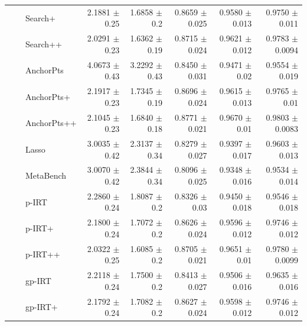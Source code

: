 \begin{longtable}{llp{}rrrrr}
 &  & Search+ & 2.1881 {\scriptsize $\pm$ 0.25} & 1.6858 {\scriptsize $\pm$ 0.2} & 0.8659 {\scriptsize $\pm$ 0.025} & 0.9580 {\scriptsize $\pm$ 0.013} & 0.9750 {\scriptsize $\pm$ 0.011} \\
 &  & Search++ & 2.0291 {\scriptsize $\pm$ 0.23} & 1.6362 {\scriptsize $\pm$ 0.19} & 0.8715 {\scriptsize $\pm$ 0.024} & 0.9621 {\scriptsize $\pm$ 0.012} & 0.9783 {\scriptsize $\pm$ 0.0094} \\
 &  & AnchorPts & 4.0673 {\scriptsize $\pm$ 0.43} & 3.2292 {\scriptsize $\pm$ 0.43} & 0.8450 {\scriptsize $\pm$ 0.031} & 0.9471 {\scriptsize $\pm$ 0.02} & 0.9554 {\scriptsize $\pm$ 0.019} \\
 &  & AnchorPts+ & 2.1917 {\scriptsize $\pm$ 0.23} & 1.7345 {\scriptsize $\pm$ 0.19} & 0.8696 {\scriptsize $\pm$ 0.024} & 0.9615 {\scriptsize $\pm$ 0.013} & 0.9765 {\scriptsize $\pm$ 0.01} \\
 &  & AnchorPts++ & 2.1045 {\scriptsize $\pm$ 0.23} & 1.6840 {\scriptsize $\pm$ 0.18} & 0.8771 {\scriptsize $\pm$ 0.021} & 0.9670 {\scriptsize $\pm$ 0.01} & 0.9803 {\scriptsize $\pm$ 0.0083} \\
 &  & Lasso & 3.0035 {\scriptsize $\pm$ 0.42} & 2.3137 {\scriptsize $\pm$ 0.34} & 0.8279 {\scriptsize $\pm$ 0.027} & 0.9397 {\scriptsize $\pm$ 0.017} & 0.9603 {\scriptsize $\pm$ 0.013} \\
 &  & MetaBench & 3.0070 {\scriptsize $\pm$ 0.42} & 2.3844 {\scriptsize $\pm$ 0.34} & 0.8096 {\scriptsize $\pm$ 0.025} & 0.9348 {\scriptsize $\pm$ 0.016} & 0.9534 {\scriptsize $\pm$ 0.014} \\
 &  & p-IRT & 2.2860 {\scriptsize $\pm$ 0.24} & 1.8087 {\scriptsize $\pm$ 0.2} & 0.8326 {\scriptsize $\pm$ 0.03} & 0.9450 {\scriptsize $\pm$ 0.018} & 0.9546 {\scriptsize $\pm$ 0.018} \\
 &  & p-IRT+ & 2.1800 {\scriptsize $\pm$ 0.24} & 1.7072 {\scriptsize $\pm$ 0.2} & 0.8626 {\scriptsize $\pm$ 0.024} & 0.9596 {\scriptsize $\pm$ 0.012} & 0.9746 {\scriptsize $\pm$ 0.012} \\
 &  & p-IRT++ & 2.0322 {\scriptsize $\pm$ 0.25} & 1.6085 {\scriptsize $\pm$ 0.2} & 0.8705 {\scriptsize $\pm$ 0.021} & 0.9651 {\scriptsize $\pm$ 0.01} & 0.9780 {\scriptsize $\pm$ 0.0099} \\
 &  & gp-IRT & 2.2118 {\scriptsize $\pm$ 0.24} & 1.7500 {\scriptsize $\pm$ 0.2} & 0.8413 {\scriptsize $\pm$ 0.027} & 0.9506 {\scriptsize $\pm$ 0.016} & 0.9635 {\scriptsize $\pm$ 0.016} \\
 &  & gp-IRT+ & 2.1792 {\scriptsize $\pm$ 0.24} & 1.7082 {\scriptsize $\pm$ 0.2} & 0.8627 {\scriptsize $\pm$ 0.024} & 0.9598 {\scriptsize $\pm$ 0.012} & 0.9746 {\scriptsize $\pm$ 0.012} \\

\end{longtable}
